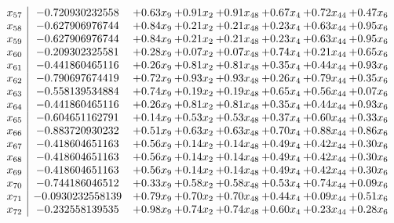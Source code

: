 \documentclass[8pt]{article}
\begin{document}
\[\begin{array}{c| c c@{\hskip 2pt} c@{\hskip 2pt} c@{\hskip 2pt} c@{\hskip 2pt} c@{\hskip 2pt} c@{\hskip 2pt} }
 x_{57}   &  -0.720930232558 & +  0.63 x_{9} & +  0.91 x_{2} & +  0.91 x_{48} & +  0.67 x_{4} & +  0.72 x_{44} & +  0.47 x_{6}\\
 x_{58}   &  -0.627906976744 & +  0.84 x_{9} & +  0.21 x_{2} & +  0.21 x_{48} & +  0.23 x_{4} & +  0.63 x_{44} & +  0.95 x_{6}\\
 x_{59}   &  -0.627906976744 & +  0.84 x_{9} & +  0.21 x_{2} & +  0.21 x_{48} & +  0.23 x_{4} & +  0.63 x_{44} & +  0.95 x_{6}\\
 x_{60}   &  -0.209302325581 & +  0.28 x_{9} & +  0.07 x_{2} & +  0.07 x_{48} & +  0.74 x_{4} & +  0.21 x_{44} & +  0.65 x_{6}\\
 x_{61}   &  -0.441860465116 & +  0.26 x_{9} & +  0.81 x_{2} & +  0.81 x_{48} & +  0.35 x_{4} & +  0.44 x_{44} & +  0.93 x_{6}\\
 x_{62}   &  -0.790697674419 & +  0.72 x_{9} & +  0.93 x_{2} & +  0.93 x_{48} & +  0.26 x_{4} & +  0.79 x_{44} & +  0.35 x_{6}\\
 x_{63}   &  -0.558139534884 & +  0.74 x_{9} & +  0.19 x_{2} & +  0.19 x_{48} & +  0.65 x_{4} & +  0.56 x_{44} & +  0.07 x_{6}\\
 x_{64}   &  -0.441860465116 & +  0.26 x_{9} & +  0.81 x_{2} & +  0.81 x_{48} & +  0.35 x_{4} & +  0.44 x_{44} & +  0.93 x_{6}\\
 x_{65}   &  -0.604651162791 & +  0.14 x_{9} & +  0.53 x_{2} & +  0.53 x_{48} & +  0.37 x_{4} & +  0.60 x_{44} & +  0.33 x_{6}\\
 x_{66}   &  -0.883720930232 & +  0.51 x_{9} & +  0.63 x_{2} & +  0.63 x_{48} & +  0.70 x_{4} & +  0.88 x_{44} & +  0.86 x_{6}\\
 x_{67}   &  -0.418604651163 & +  0.56 x_{9} & +  0.14 x_{2} & +  0.14 x_{48} & +  0.49 x_{4} & +  0.42 x_{44} & +  0.30 x_{6}\\
 x_{68}   &  -0.418604651163 & +  0.56 x_{9} & +  0.14 x_{2} & +  0.14 x_{48} & +  0.49 x_{4} & +  0.42 x_{44} & +  0.30 x_{6}\\
 x_{69}   &  -0.418604651163 & +  0.56 x_{9} & +  0.14 x_{2} & +  0.14 x_{48} & +  0.49 x_{4} & +  0.42 x_{44} & +  0.30 x_{6}\\
 x_{70}   &  -0.744186046512 & +  0.33 x_{9} & +  0.58 x_{2} & +  0.58 x_{48} & +  0.53 x_{4} & +  0.74 x_{44} & +  0.09 x_{6}\\
 x_{71}   &  -0.0930232558139 & +  0.79 x_{9} & +  0.70 x_{2} & +  0.70 x_{48} & +  0.44 x_{4} & +  0.09 x_{44} & +  0.51 x_{6}\\
 x_{72}   &  -0.232558139535 & +  0.98 x_{9} & +  0.74 x_{2} & +  0.74 x_{48} & +  0.60 x_{4} & +  0.23 x_{44} & +  0.28 x_{6}\\

\end{array}\]
\end{document}

